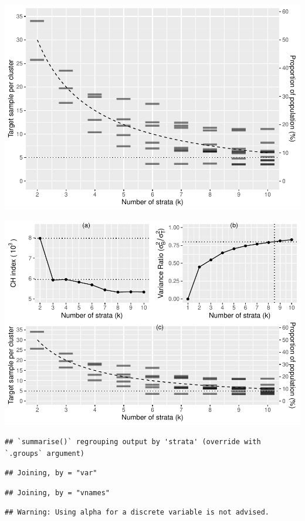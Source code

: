 \documentclass[
  english,
  man,floatsintext]{apa6}
\begin{document}
\includegraphics{5---Analysis_files/figure-latex/unnamed-chunk-5-1.pdf}

\includegraphics{5---Analysis_files/figure-latex/unnamed-chunk-6-1.pdf}

\begin{verbatim}
## `summarise()` regrouping output by 'strata' (override with `.groups` argument)
\end{verbatim}

\begin{verbatim}
## Joining, by = "var"
\end{verbatim}

\begin{verbatim}
## Joining, by = "vnames"
\end{verbatim}

\begin{verbatim}
## Warning: Using alpha for a discrete variable is not advised.
\end{verbatim}
\end{document}
